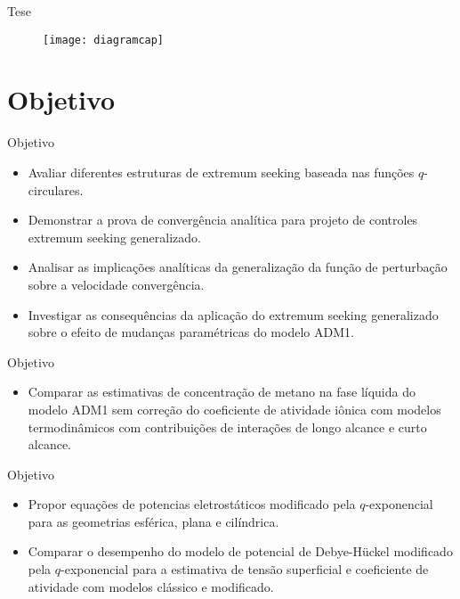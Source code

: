 \documentclass{beamer}
\begin{document}
\begin{frame}
\begin{block}{Tese}
\begin{figure}[ht] 
    \texttt{[image: diagramcap]} 
    \end{figure}
\end{block}
\end{frame}

\section{Objetivo}


\begin{frame}{Objetivo}
\begin{block}{}
\begin{itemize}
\item Avaliar diferentes estruturas de extremum seeking baseada nas funções $q$-circulares.
\item Demonstrar a prova de convergência analítica para projeto de controles extremum seeking generalizado.
\item Analisar as implicações analíticas da generalização da função de perturbação sobre a velocidade convergência.
\item Investigar as consequências da aplicação do extremum seeking generalizado sobre o
efeito de mudanças paramétricas do modelo ADM1.
\end{itemize}
\end{block}
\end{frame}


\begin{frame}{Objetivo}
\begin{block}{}
\begin{itemize}
\item Comparar as estimativas de concentração de metano na fase líquida do modelo ADM1
sem correção do coeficiente de atividade iônica com modelos termodinâmicos com contribuições de interações de longo alcance e curto alcance.
 \end{itemize}
\end{block}
\end{frame}


\begin{frame}{Objetivo}
\begin{block}{}
\begin{itemize}
\item Propor equações de potencias eletrostáticos modificado pela $q$-exponencial para as geometrias esférica, plana e cilíndrica.
\item Comparar o desempenho do modelo de potencial de Debye-Hückel modificado pela $q$-exponencial para a estimativa de tensão superficial e coeficiente de atividade com modelos clássico e modificado.
 \end{itemize}
\end{block}
\end{frame}
\end{document}
